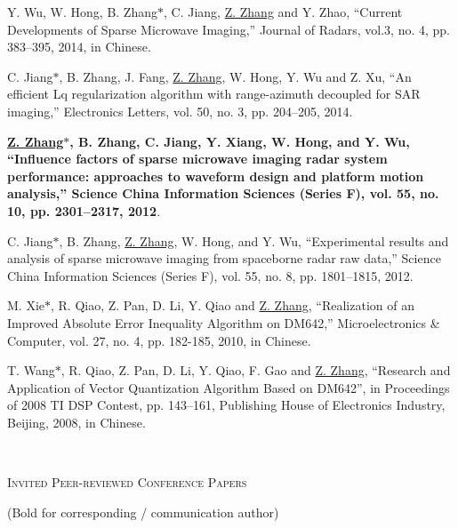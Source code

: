 \documentclass[paper=a4,fontsize=11pt]{scrartcl}
\begin{document}
\begin{description}
\item Y. Wu, W. Hong, B. Zhang$\ast$, C. Jiang, \underline{Z. Zhang} and Y. Zhao, ``Current Developments of Sparse Microwave Imaging,'' Journal of Radars, vol.3, no. 4, pp. 383--395, 2014, in Chinese.

\item C. Jiang$\ast$, B. Zhang, J. Fang, \underline{Z. Zhang}, W. Hong, Y. Wu and Z. Xu, ``An efficient Lq regularization algorithm with range-azimuth decoupled for SAR imaging,'' Electronics Letters, vol. 50, no. 3, pp. 204--205, 2014.

\item \textbf{\underline{Z. Zhang$\ast$}, B. Zhang, C. Jiang, Y. Xiang, W. Hong, and Y. Wu, ``Influence factors of sparse microwave imaging radar system performance: approaches to waveform design and platform motion analysis,'' Science China Information Sciences (Series F), vol. 55, no. 10, pp. 2301--2317, 2012}.

\item C. Jiang$\ast$, B. Zhang, \underline{Z. Zhang}, W. Hong, and Y. Wu, ``Experimental results and analysis of sparse microwave imaging from spaceborne radar raw data,'' Science China Information Sciences (Series F), vol. 55, no. 8, pp. 1801--1815, 2012.


\item M. Xie$\ast$, R. Qiao, Z. Pan, D. Li, Y. Qiao and \underline{Z. Zhang}, ``Realization of an Improved Absolute Error Inequality Algorithm on DM642,'' Microelectronics \& Computer, vol. 27, no. 4, pp. 182-185, 2010, in Chinese.

\item T. Wang$\ast$, R. Qiao, Z. Pan, D. Li, Y. Qiao, F. Gao and \underline{Z. Zhang}, ``Research and Application of Vector Quantization Algorithm Based on DM642'', in Proceedings of 2008 TI DSP Contest, pp. 143--161, Publishing House of Electronics Industry, Beijing, 2008, in Chinese. 

~\\

\end{description}

\textsc{Invited Peer-reviewed Conference Papers}

(Bold for corresponding / communication author)
\end{document}

